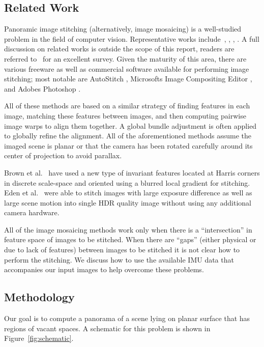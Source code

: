 \documentclass[11pt]{article}
\begin{document}
\subsection{Related Work}
Panoramic image stitching (alternatively, image mosaicing) is a
well-studied problem in the field of computer vision.  Representative
works include~\cite{Milgram1975}, \cite{Milgram1977}, \cite{Capel},
\cite{Szeliski1997} \cite{Brown07} \cite{Brown03}.  A full discussion
on related works is outside the scope of this report, readers are
referred to~\cite{Szeliski05imagealignment} for an excellent survey.
Given the maturity of this area, there are various freeware as well as
commercial software available for performing image stitching; most
notable are AutoStitch \cite{autostitch}, Microsoft\textsc{}s Image
Compositing Editor \cite{ICE}, and Adobe\textsc{}s Photoshop
\cite{photoshop}.

All of these methods are based on a similar strategy of finding
features in each image, matching these features between images, and
then computing pairwise image warps to align them together.  A global
bundle adjustment is often applied to globally refine the alignment.
All of the aforementioned methods assume the imaged scene is planar or
that the camera has been rotated carefully around its center of
projection to avoid parallax.

Brown et al.~\cite{Brown05} have used a new type of invariant features
located at Harris corners in discrete scale-space and oriented using a
blurred local gradient for stitching. Eden et al.~\cite{Eden} were
able to stitch images with large exposure difference as well as large
scene motion into single HDR quality image without using any
additional camera hardware.

All of the image mosaicing methods work only when there is a
``intersection'' in feature space of images to be stitched. When there
are ``gaps'' (either physical or due to lack of features) between
images to be stitched it is not clear how to perform the stitching. We discuss
how to use the available IMU data that accompanies our input images to help
overcome these problems.

\subsection{Methodology}
Our goal is to compute a panorama of a scene lying on
planar surface that has regions of vacant spaces.  A schematic for
this problem is shown in Figure~\ref{fig:schematic}.
\end{document}
